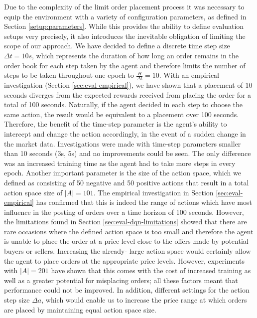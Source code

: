     Due to the complexity of the limit order placement process it was necessary to equip the environment with a variety of configuration parameters, as defined in Section \ref{setup:parameters}.
    While this provides the ability to define evaluation setups very precisely, it also introduces the inevitable obligation of limiting the scope of our approach.
    We have decided to define a discrete time step size $\Delta{t}=10s$, which represents the duration of how long an order remains in the order book for each step taken by the agent and therefore limits the number of steps to be taken throughout one epoch to $\frac{H}{\Delta{t}}=10$.
    With an empirical investigation (Section \ref{sec:eval-empirical}), we have shown that a placement of 10 seconds diverges from the expected rewards received from placing the order for a total of 100 seconds.
    Naturally, if the agent decided in each step to choose the same action, the result would be equivalent to a placement over 100 seconds.
    Therefore, the benefit of the time-step parameter is the agent's ability to intercept and change the action accordingly, in the event of a sudden change in the market data.
    Investigations were made with time-step parameters smaller than 10 seconds (3s, 5s) and no improvements could be seen.
    The only difference was an increased training time as the agent had to take more steps in every epoch.
    Another important parameter is the size of the action space, which we defined as consisting of 50 negative and 50 positive actions that result in a total action space size of $|A|=101$.
    The empirical investigation in Section \ref{sec:eval-empirical} has confirmed that this is indeed the range of actions which have most influence in the posting of orders over a time horizon of 100 seconds.
    However, the limitations found in Section \ref{sec:eval-dqn-limitations} showed that there are rare occasions where the defined action space is too small and therefore the agent is unable to place the order at a price level close to the offers made by potential buyers or sellers.
    Increasing the already- large action space would certainly allow the agent to place orders at the appropriate price levels.
    However, experiments with $|A|=201$ have shown that this comes with the cost of increased training as well as a greater potential for misplacing orders; all these factors meant that performance could not be improved.
    In addition, different settings for the action step size $\Delta{a}$, which would enable us to increase the price range at which orders are placed by maintaining equal action space size.
